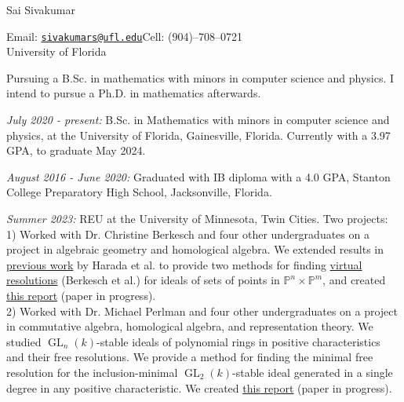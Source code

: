 \documentclass[11pt]{article}
\DeclareMathOperator{\GL}{GL}
\begin{document}
{\huge Sai Sivakumar}

Email: \href{mailto:sivakumars@ufl.edu}{\texttt{sivakumars@ufl.edu}}\hspace{6.38cm}Cell: (904)--708--0721\\%
\hspace*{-1cm}University of Florida\\


Pursuing a B.Sc. in mathematics with minors in computer science and physics. I intend to pursue a Ph.D. in mathematics afterwards.


\textsl{July 2020 - present:} B.Sc. in Mathematics with minors in computer science and physics, at the University of Florida, Gainesville, Florida. Currently with a 3.97 GPA, to graduate May 2024.

\textsl{August 2016 - June 2020:} Graduated with IB diploma with a 4.0 GPA, Stanton College Preparatory High School, Jacksonville, Florida.


\textsl{Summer 2023:} REU at the University of Minnesota, Twin Cities. Two projects: \\
1) Worked with Dr. Christine Berkesch and four other undergraduates on a project in algebraic geometry and homological algebra. We extended results in {\color{blue}\href{https://arxiv.org/abs/2106.02759}{previous work}} by Harada et al. to provide two methods for finding {\color{blue}\href{https://arxiv.org/abs/1703.07631}{virtual resolutions}} (Berkesch et al.) for ideals of sets of points in $\mathbb{P}^n\times \mathbb P^m$, and created {\color{blue}\href{https://www-users.cse.umn.edu/~reiner/REU/REU2023notes/2_VResPointsReport.pdf}{this report}} (paper in progress).\\
2) Worked with Dr. Michael Perlman and four other undergraduates on a project in commutative algebra, homological algebra, and representation theory. We studied $\GL_n(k)$-stable ideals of polynomial rings in positive characteristics and their free resolutions. We provide a method for finding the minimal free resolution for the inclusion-minimal $\GL_2(k)$-stable ideal generated in a single degree in any positive characteristic. %
We created {\color{blue}\href{https://www-users.cse.umn.edu/~reiner/REU/REU2023notes/4_GL_stable_Ideals_in_Positive_Characteristic.pdf}{this report}} (paper in progress).
\end{document}
